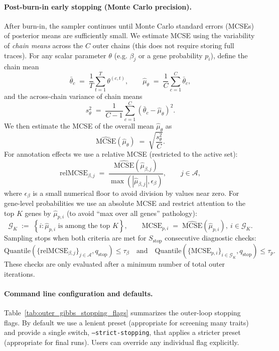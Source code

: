 \documentclass[11pt]{article}
\begin{document}
\paragraph{Post-burn-in early stopping (Monte Carlo precision).}
After burn-in, the sampler continues until Monte Carlo standard errors (MCSEs) of posterior means
are sufficiently small. We estimate MCSE using the variability of \emph{chain means} across the $C$
outer chains (this does not require storing full traces). For any scalar parameter $\theta$ (e.g.
$\beta_j$ or a gene probability $p_i$), define the chain mean
\[
\bar\theta_c \;=\; \frac{1}{T}\sum_{t=1}^T \theta^{(c,t)}, \qquad
\hat\mu_\theta \;=\; \frac{1}{C}\sum_{c=1}^C \bar\theta_c,
\]
and the across-chain variance of chain means
\[
s_\theta^2 \;=\; \frac{1}{C-1}\sum_{c=1}^C (\bar\theta_c - \hat\mu_\theta)^2.
\]
We then estimate the MCSE of the overall mean $\hat\mu_\theta$ as
\[
\widehat{\mathrm{MCSE}}(\hat\mu_\theta) \;=\; \sqrt{\frac{s_\theta^2}{C}}.
\]
For annotation effects we use a relative MCSE (restricted to the active set):
\[
\mathrm{relMCSE}_{\beta,j}
\;=\;
\frac{\widehat{\mathrm{MCSE}}(\hat\mu_{\beta,j})}{\max(|\hat\mu_{\beta,j}|,\epsilon_\beta)},
\qquad j \in \mathcal{A},
\]
where $\epsilon_\beta$ is a small numerical floor to avoid division by values near zero.
For gene-level probabilities we use an absolute MCSE and restrict attention to the top $K$ genes by
$\hat\mu_{p,i}$ (to avoid ``max over all genes'' pathology):
\[
\mathcal{G}_K \;:=\; \left\{ i : \hat\mu_{p,i} \text{ is among the top } K \right\}, \qquad
\mathrm{MCSE}_{p,i} \;=\; \widehat{\mathrm{MCSE}}(\hat\mu_{p,i}),\ i\in \mathcal{G}_K.
\]
Sampling stops when both criteria are met for $S_{\mathrm{stop}}$ consecutive diagnostic checks:
\[
\mathrm{Quantile}\left(\{\mathrm{relMCSE}_{\beta,j}\}_{j\in\mathcal{A}}, q_{\mathrm{stop}}\right)
\le \tau_\beta
\quad\text{and}\quad
\mathrm{Quantile}\left(\{\mathrm{MCSE}_{p,i}\}_{i\in\mathcal{G}_K}, q_{\mathrm{stop}}\right)
\le \tau_p.
\]
These checks are only evaluated after a minimum number of total outer iterations.

\paragraph{Command line configuration and defaults.}
Table~\ref{tab:outer_gibbs_stopping_flags} summarizes the outer-loop stopping flags. By default we
use a lenient preset (appropriate for screening many traits) and provide a single switch,
\texttt{--strict-stopping}, that applies a stricter preset (appropriate for final runs). Users can
override any individual flag explicitly.
\end{document}
